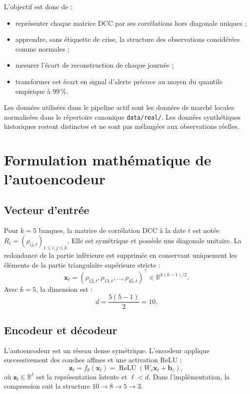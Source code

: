 \documentclass[12pt,a4paper]{article}
\begin{document}
L'objectif est donc de :
\begin{itemize}
  \item représenter chaque matrice DCC par ses corrélations hors diagonale uniques ;
  \item apprendre, sans étiquette de crise, la structure des observations considérées comme normales ;
  \item mesurer l'écart de reconstruction de chaque journée ;
  \item transformer cet écart en signal d'alerte précoce au moyen du quantile empirique à 99\,\%.
\end{itemize}

Les données utilisées dans le pipeline actif sont les données de marché locales normalisées dans
le répertoire canonique \texttt{data/real/}. Les données synthétiques historiques restent
distinctes et ne sont pas mélangées aux observations réelles.

\section{Formulation mathématique de l'autoencodeur}

\subsection{Vecteur d'entrée}

Pour $k=5$ banques, la matrice de corrélation DCC à la date $t$ est notée
$R_t=(\rho_{ij,t})_{1\leq i,j\leq k}$. Elle est symétrique et possède une diagonale unitaire.
La redondance de la partie inférieure est supprimée en conservant uniquement les éléments de la
partie triangulaire supérieure stricte :
\[
  \mathbf{x}_t =
  \left(
  \rho_{12,t},\rho_{13,t},\ldots,\rho_{45,t}
  \right)^\top
  \in \mathbb{R}^{k(k-1)/2}.
\]
Avec $k=5$, la dimension est :
\[
  d=\frac{5(5-1)}{2}=10.
\]

\subsection{Encodeur et décodeur}

L'autoencodeur est un réseau dense symétrique. L'encodeur applique successivement des couches
affines et une activation ReLU :
\[
  \mathbf{z}_t=f_{\theta}(\mathbf{x}_t)
  =\operatorname{ReLU}\!\left(
  W_e\mathbf{x}_t+\mathbf{b}_e
  \right),
\]
où $\mathbf{z}_t\in\mathbb{R}^{\ell}$ est la représentation latente et $\ell<d$. Dans
l'implémentation, la compression suit la structure $10\rightarrow 8\rightarrow 5\rightarrow 3$.
\end{document}
